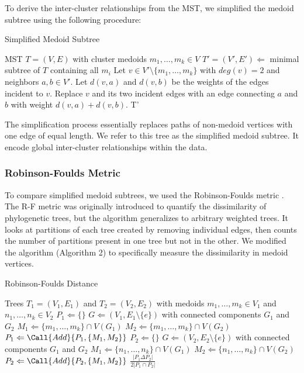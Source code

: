 \documentclass{article}
\begin{document}
To derive the inter-cluster relationships from the MST, we simplified the medoid subtree using the following procedure:

\begin{algorithm}[H]
\caption{Simplified Medoid Subtree}\label{algo1}
\begin{algorithmic}[1]
\Require MST $T = (V, E)$ with cluster medoids $m_1, \hdots, m_k \in V$
\State $T' = (V', E') \Leftarrow$ minimal subtree of $T$ containing all $m_i$
\Repeat
	\State Let $v \in V' \setminus \{m_1,  \hdots, m_k\}$ with $deg(v) = 2$ and neighbors $a, b \in V'$. Let $d(v, a)$ and $d(v, b)$ be the weights of the edges incident to $v$.
	\State Replace $v$ and its two incident edges with an edge connecting $a$ and $b$ with weight $d(v, a) + d(v, b)$.
\State \Output T'
\end{algorithmic}
\end{algorithm}

The simplification process essentially replaces paths of non-medoid vertices with one edge of equal length. We refer to this tree as the simplified medoid subtree. It encode global inter-cluster relationships within the data.

\subsubsection{Robinson-Foulds Metric}
To compare simplified medoid subtrees, we used the Robinson-Foulds metric \cite{RF metric}. The R-F metric was originally introduced to quantify the dissimilarity of phylogenetic trees, but the algorithm generalizes to arbitrary weighted trees. It looks at partitions of each tree created by removing individual edges, then counts the number of partitions present in one tree but not in the other. We modified the algorithm (Algorithm 2) to specifically measure the dissimilarity in medoid vertices.

\begin{algorithm}[H]
\caption{Robinson-Foulds Distance}\label{algo2}
\begin{algorithmic}[2]
\Require Trees $T_1 = (V_1,E_1)$ and $T_2 = (V_2, E_2)$ with medoids $m_1, \hdots, m_k \in V_1$ and $n_1, \hdots, n_k \in V_2$
\State $P_1 \Leftarrow \{\}$
	\State $G \Leftarrow (V_1, E_1 \setminus \{e\})$ with connected components $G_1$ and $G_2$
	\State $M_1 \Leftarrow \{m_1,\hdots,m_k\} \cap V(G_1)$
	\State $M_2 \Leftarrow \{m_1,\hdots,m_k\} \cap V(G_2)$
	\State $P_1 \Leftarrow \Call{Add}{P_1, \{M_1, M_2\}}$
\EndFor
\State $P_2 \Leftarrow \{\}$
	\State $G \Leftarrow (V_2, E_2 \setminus \{e\})$ with connected components $G_1$ and $G_2$
	\State $M_1 \Leftarrow \{n_1,\hdots,n_k\} \cap V(G_1)$
	\State $M_2 \Leftarrow \{n_1,\hdots,n_k\} \cap V(G_2)$
	\State $P_2 \Leftarrow \Call{Add}{P_2, \{M_1, M_2\}}$
\EndFor
\State \Output $\frac{\left|P_1 \Delta P_2 \right|}{2\left| P_1 \cap P_2 \right|}$
\end{algorithmic}
\end{algorithm}
\end{document}
